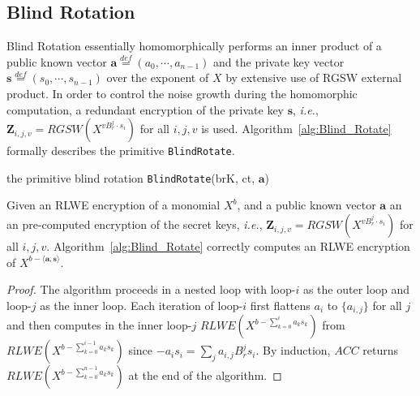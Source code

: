 \documentclass{iacrtrans}
\theoremstyle{plain}
\begin{document}
\subsection{Blind Rotation}
Blind Rotation essentially homomorphically performs an inner product of a public known vector $\mathbf{a}\overset{def}{=}(a_0,\cdots, a_{n-1})$ and the private key vector $\mathbf{s}\overset{def}{=}(s_0,\cdots, s_{n-1})$ over the exponent of $X$ by extensive use of RGSW external product. In order to control the noise growth during the homomorphic computation, a redundant encryption of the private key $\mathbf{s}$, \textit{i.e.}, $\mathbf{Z}_{i,j,v}=RGSW(X^{vB_r^j\cdot s_i})$ for all $i, j, v$ is used. Algorithm~\ref{alg:Blind_Rotate} formally describes the primitive \texttt{BlindRotate}.

\begin{algorithm}[!tbh]
\DontPrintSemicolon %
\caption{the primitive blind rotation \texttt{BlindRotate}(brK, ct, $\mathbf{a}$)}\label{alg:Blind_Rotate}
\end{algorithm}

\begin{proposition}
Given an RLWE encryption of a monomial $X^b$, and a public known vector $\mathbf{a}$ an an pre-computed encryption of the secret keys, \textit{i.e.}, $\mathbf{Z}_{i,j,v}=RGSW(X^{vB_r^j\cdot s_i})$ for all $i, j, v$. Algorithm~\ref{alg:Blind_Rotate} correctly computes an RLWE encryption of $X^{b-\langle \mathbf{a}, \mathbf{s}\rangle}$.
\end{proposition}
\begin{proof}
The algorithm proceeds in a nested loop with loop-$i$ as the outer loop and loop-$j$ as the inner loop. Each iteration of loop-$i$ first flattens $a_i$ to $\{a_{i,j}\}$ for all $j$ and then computes in the inner loop-$j$ $RLWE(X^{b-\sum_{k=0}^{i} a_ks_k})$ from $RLWE(X^{b-\sum_{k=0}^{i-1} a_ks_k})$ since $-a_is_i=\sum_j a_{i,j}B_r^js_i$. By induction,  $ACC$ returns $RLWE(X^{b-\sum_{k=0}^{n-1} a_ks_k})$ at the end of the algorithm.
\end{proof}
\end{document}
